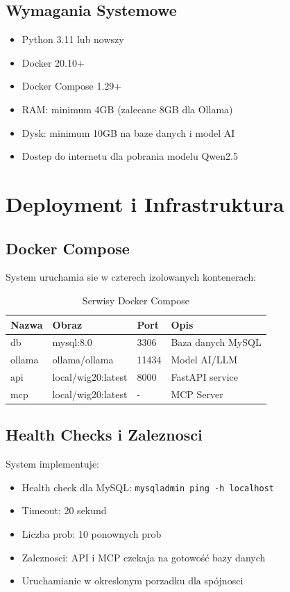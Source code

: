 \documentclass[11pt,a4paper]{article}
\begin{document}
\subsection{Wymagania Systemowe}

\begin{itemize}
    \item Python 3.11 lub nowszy
    \item Docker 20.10+
    \item Docker Compose 1.29+
    \item RAM: minimum 4GB (zalecane 8GB dla Ollama)
    \item Dysk: minimum 10GB na baze danych i model AI
    \item Dostep do internetu dla pobrania modelu Qwen2.5
\end{itemize}

\section{Deployment i Infrastruktura}

\subsection{Docker Compose}

System uruchamia sie w czterech izolowanych kontenerach:

\begin{table}[H]
\centering
\begin{tabular}{|l|l|l|l|}
\hline
\textbf{Nazwa} & \textbf{Obraz} & \textbf{Port} & \textbf{Opis} \\
\hline
db & mysql:8.0 & 3306 & Baza danych MySQL \\
ollama & ollama/ollama & 11434 & Model AI/LLM \\
api & local/wig20:latest & 8000 & FastAPI service \\
mcp & local/wig20:latest & - & MCP Server \\
\hline
\end{tabular}
\caption{Serwisy Docker Compose}
\end{table}

\subsection{Health Checks i Zaleznosci}

System implementuje:
\begin{itemize}
    \item Health check dla MySQL: \texttt{mysqladmin ping -h localhost}
    \item Timeout: 20 sekund
    \item Liczba prob: 10 ponownych prob
    \item Zaleznosci: API i MCP czekaja na gotowość bazy danych
    \item Uruchamianie w okreslonym porzadku dla spójnosci
\end{itemize}
\end{document}
